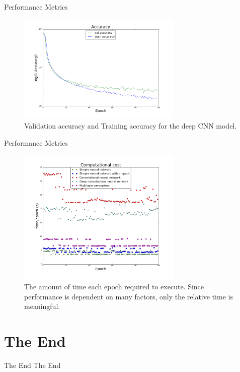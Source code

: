 \begin{frame}[plain]{Performance Metrics}
\begin{figure}
\includegraphics[width = 0.7\textwidth]{cnn_accuracy}
\caption{Validation accuracy and Training accuracy for the deep CNN model.}
\end{figure}
\end{frame}

\begin{frame}[plain]{Performance Metrics}
\begin{figure}
\includegraphics[width = 0.7\textwidth]{comp}
\caption{The amount of time each epoch required to execute. Since performance is dependent on many factors, only the relative time is meaningful.}
\end{figure}
\end{frame}

\section{The End}
\begin{frame}[c]{The End}\centering
\huge The End
\end{frame}

